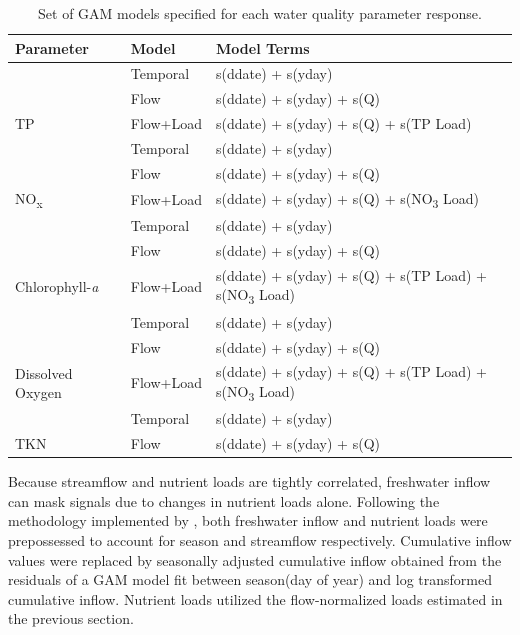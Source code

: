 \documentclass[fleqn,10pt,lineno]{wlpeerj} %
\begin{document}
\begin{table}

\caption{\label{tab:table3}Set of GAM models specified for each water quality parameter response.}
\centering
\begin{tabular}[t]{lll}
\toprule
Parameter & Model & Model Terms\\
\midrule
 & Temporal & s(ddate) + s(yday)\\

 & Flow & s(ddate) + s(yday) + s(Q)\\

\multirow{-3}{*}{\raggedright\arraybackslash TP} & Flow+Load & s(ddate) + s(yday) + s(Q) + s(TP Load)\\
\cmidrule{1-3}
 & Temporal & s(ddate) + s(yday)\\

 & Flow & s(ddate) + s(yday) + s(Q)\\

\multirow{-3}{*}{\raggedright\arraybackslash NO\textsubscript{x}} & Flow+Load & s(ddate) + s(yday) + s(Q) + s(NO\textsubscript{3} Load)\\
\cmidrule{1-3}
 & Temporal & s(ddate) + s(yday)\\

 & Flow & s(ddate) + s(yday) + s(Q)\\

\multirow{-3}{*}{\raggedright\arraybackslash Chlorophyll-\textit{a}} & Flow+Load & s(ddate) + s(yday) + s(Q) + s(TP Load) + s(NO\textsubscript{3} Load)\\
\cmidrule{1-3}
 & Temporal & s(ddate) + s(yday)\\

 & Flow & s(ddate) + s(yday) + s(Q)\\

\multirow{-3}{*}{\raggedright\arraybackslash Dissolved Oxygen} & Flow+Load & s(ddate) + s(yday) + s(Q) + s(TP Load) + s(NO\textsubscript{3}  Load)\\
\cmidrule{1-3}
 & Temporal & s(ddate) + s(yday)\\

\multirow{-2}{*}{\raggedright\arraybackslash TKN} & Flow & s(ddate) + s(yday) + s(Q)\\
\bottomrule
\end{tabular}
\end{table}

Because streamflow and nutrient loads are tightly correlated, freshwater
inflow can mask signals due to changes in nutrient loads alone.
Following the methodology implemented by
\textcite{murphyNutrientImprovementsChesapeake2022}, both freshwater
inflow and nutrient loads were prepossessed to account for season and
streamflow respectively. Cumulative inflow values were replaced by
seasonally adjusted cumulative inflow obtained from the residuals of a
GAM model fit between season(day of year) and log transformed cumulative
inflow. Nutrient loads utilized the flow-normalized loads estimated in
the previous section.
\end{document}
